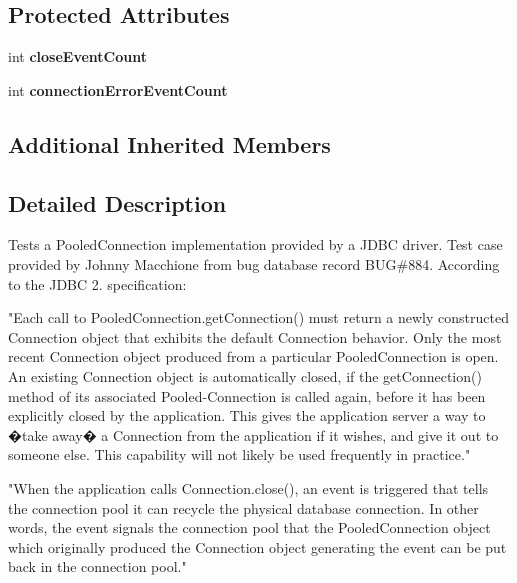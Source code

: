 \subsection*{Protected Attributes}
\begin{DoxyCompactItemize}
\item 
\mbox{\label{classtestsuite_1_1regression_1_1_pooled_connection_regression_test_ad10232005bb57d1bd35f4f73a363c51a}} 
int {\bfseries close\+Event\+Count}
\item 
\mbox{\label{classtestsuite_1_1regression_1_1_pooled_connection_regression_test_a84de35b9e122bb662e4c5947849b7383}} 
int {\bfseries connection\+Error\+Event\+Count}
\end{DoxyCompactItemize}
\subsection*{Additional Inherited Members}


\subsection{Detailed Description}
Tests a Pooled\+Connection implementation provided by a J\+D\+BC driver. Test case provided by Johnny Macchione from bug database record B\+UG\#884. According to the J\+D\+BC 2. specification\+:

"Each call to Pooled\+Connection.\+get\+Connection() must return a newly constructed Connection object that exhibits the default Connection behavior. Only the most recent Connection object produced from a particular Pooled\+Connection is open. An existing Connection object is automatically closed, if the get\+Connection() method of its associated Pooled-\/\+Connection is called again, before it has been explicitly closed by the application. This gives the application server a way to �take away� a Connection from the application if it wishes, and give it out to someone else. This capability will not likely be used frequently in practice." 

"When the application calls Connection.\+close(), an event is triggered that tells the connection pool it can recycle the physical database connection. In other words, the event signals the connection pool that the Pooled\+Connection object which originally produced the Connection object generating the event can be put back in the connection pool." 

